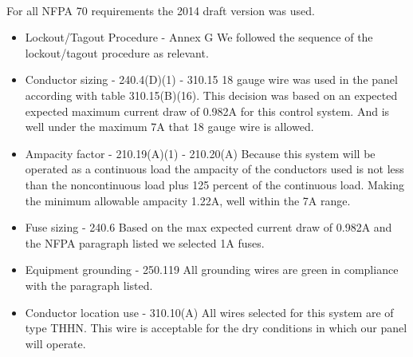 \paragraph{} For all NFPA 70 requirements the 2014 draft version was used.

\begin{itemize}
  \item Lockout/Tagout Procedure - Annex G {\newline} {\indent}
    We followed the sequence of the lockout/tagout procedure as relevant.
  \item Conductor sizing - 240.4(D)(1) - 310.15 {\newline} {\indent}
    18 gauge wire was used in the panel according with table 310.15(B)(16).
    This decision was based on an  expected expected maximum current
    draw of 0.982A for this control system.
    And is well under the maximum 7A that 18 gauge wire is allowed.
  \item Ampacity factor - 210.19(A)(1) - 210.20(A) {\newline} {\indent}
    Because this system will be operated as a continuous load the
    ampacity of the conductors used is not less
    than the noncontinuous load plus 125 percent of the continuous
    load. Making the minimum allowable ampacity
    1.22A, well within the 7A range.
  \item Fuse sizing - 240.6 {\newline} {\indent}
    Based on the max expected current draw of 0.982A and the NFPA
    paragraph listed we selected 1A fuses.
  \item Equipment grounding - 250.119 {\newline} {\indent}
    All grounding wires are green in compliance with the paragraph listed.
  \item Conductor location use - 310.10(A) {\newline} {\indent}
    All wires selected for this system are of type THHN. This wire is
    acceptable for the dry conditions in which
    our panel will operate.
\end{itemize}
